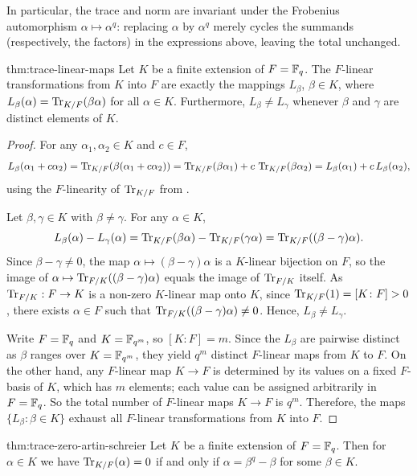In particular, the trace and norm are invariant under the Frobenius automorphism $\alpha\mapsto\alpha^q$: replacing $\alpha$ by $\alpha^q$ merely cycles the summands (respectively, the factors) in the expressions above, leaving the total unchanged.

\begin{Theorem}{}{thm:trace-linear-maps}
  Let $K$ be a finite extension of $F=\mathbb{F}_q$. The $F$-linear transformations from $K$ into $F$ are exactly the mappings $L_\beta$, $\beta\in K$, where $L_\beta(\alpha)=\operatorname{Tr}_{K/F}(\beta\alpha)$ for all $\alpha\in K$. Furthermore, $L_\beta\neq L_\gamma$ whenever $\beta$ and $\gamma$ are distinct elements of $K$.
\end{Theorem}
\begin{proof}
  For any $\alpha_1,\alpha_2\in K$ and $c\in F$,
  \[
    L_\beta(\alpha_1+c\alpha_2) = \operatorname{Tr}_{K/F}(\beta(\alpha_1+c\alpha_2))
    = \operatorname{Tr}_{K/F}(\beta\alpha_1) + c\,\operatorname{Tr}_{K/F}(\beta\alpha_2)
    = L_\beta(\alpha_1) + c\,L_\beta(\alpha_2),
  \]
  using the $F$-linearity of $\operatorname{Tr}_{K/F}$ from \TraceNormPropsthm.

  Let $\beta,\gamma\in K$ with $\beta\neq\gamma$. For any $\alpha\in K$,
  \[
    L_\beta(\alpha) - L_\gamma(\alpha) = \operatorname{Tr}_{K/F}(\beta\alpha) - \operatorname{Tr}_{K/F}(\gamma\alpha)
    = \operatorname{Tr}_{K/F}((\beta-\gamma)\alpha).
  \]
  Since $\beta-\gamma\neq 0$, the map $\alpha\mapsto(\beta-\gamma)\alpha$ is a $K$-linear bijection on $F$, so the image of $\alpha\mapsto\operatorname{Tr}_{F/K}((\beta-\gamma)\alpha)$ equals the image of $\operatorname{Tr}_{F/K}$ itself. As $\operatorname{Tr}_{F/K}:F\to K$ is a non-zero $K$-linear map onto $K$, since $\operatorname{Tr}_{K/F}(1)=[K\colon F]>0$, there exists $\alpha\in F$ such that $\operatorname{Tr}_{F/K}((\beta-\gamma)\alpha)\neq 0$. Hence, $L_\beta\neq L_\gamma$.


  Write $F=\mathbb{F}_q$ and $K=\mathbb{F}_{q^m}$, so $[K\colon F]=m$. Since the $L_\beta$ are pairwise distinct as $\beta$ ranges over $K=\mathbb{F}_{q^m}$, they yield $q^m$ distinct $F$-linear maps from $K$ to $F$. On the other hand, any $F$-linear map $K\to F$ is determined by its values on a fixed $F$-basis of $K$, which has $m$ elements; each value can be assigned arbitrarily in $F=\mathbb{F}_q$. So the total number of $F$-linear maps $K\to F$ is $q^m$. Therefore, the maps $\{L_\beta:\beta\in K\}$ exhaust all $F$-linear transformations from $K$ into $F$.

\end{proof}

\begin{Theorem}{}{thm:trace-zero-artin-schreier}
  Let $K$ be a finite extension of $F=\mathbb{F}_q$. Then for $\alpha\in K$ we have $\operatorname{Tr}_{K/F}(\alpha)=0$ if and only if $\alpha=\beta^q-\beta$ for some $\beta\in K$.
\end{Theorem}

